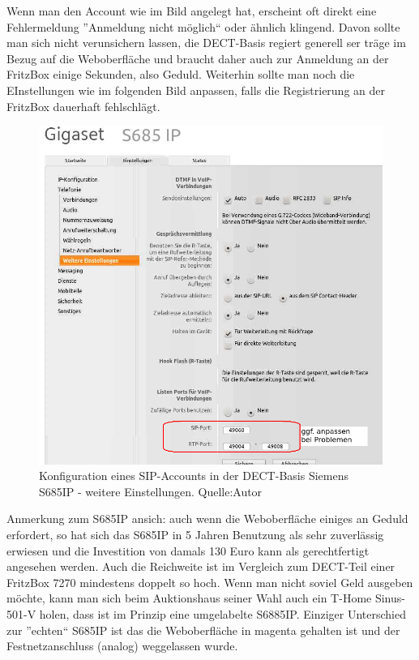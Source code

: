 \documentclass[a4paper,12pt]{scrbook}
\begin{document}
Wenn man den Account wie im Bild angelegt hat, erscheint oft direkt eine Fehlermeldung ''Anmeldung nicht möglich`` oder ähnlich klingend.
Davon sollte man sich nicht verunsichern lassen, die DECT-Basis regiert generell ser träge im Bezug auf die Weboberfläche und braucht daher
auch zur Anmeldung an der FritzBox einige Sekunden, also Geduld. Weiterhin sollte man noch die EInstellungen wie im folgenden Bild anpassen, falls
die Registrierung an der FritzBox dauerhaft fehlschlägt.

\begin{figure}[H]
\begin{center}
\includegraphics[width=.8\hsize]{./images/voip-client-s685ip-02.png}
\end{center}
\caption[Konfiguration eines SIP-Accounts in der DECT-Basis Siemens S685IP - weitere Einstellungen.]
{\label{voip-client-nexus5}Konfiguration eines SIP-Accounts in der DECT-Basis Siemens S685IP - weitere Einstellungen. Quelle:Autor}
\end{figure}

Anmerkung zum S685IP ansich: auch wenn die Weboberfläche einiges an Geduld erfordert, so hat sich das S685IP in 5 Jahren Benutzung als sehr zuverlässig 
erwiesen und die Investition von damals 130 Euro kann als gerechtfertigt angesehen werden. Auch die Reichweite ist im Vergleich zum DECT-Teil einer FritzBox
7270 mindestens doppelt so hoch. Wenn man nicht soviel Geld ausgeben möchte, kann man sich beim Auktionshaus seiner Wahl auch ein T-Home Sinus-501-V holen, dass
ist im Prinzip eine umgelabelte S6885IP. Einziger Unterschied zur ''echten`` S685IP ist das die Weboberfläche in magenta gehalten ist und der Festnetzanschluss (analog)
weggelassen wurde.
\end{document}

